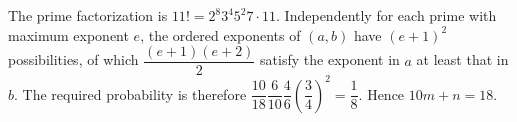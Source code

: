 The prime factorization is $11!=2^8 3^4 5^2 7\cdot11$. Independently for each prime with maximum exponent $e$, the ordered exponents of $(a,b)$ have $(e+1)^2$ possibilities, of which $\dfrac{(e+1)(e+2)}{2}$ satisfy the exponent in $a$ at least that in $b$. The required probability is therefore $\dfrac{10}{18}\dfrac{6}{10}\dfrac{4}{6}\left(\dfrac{3}{4}\right)^2=\dfrac{1}{8}$. Hence $\boxed{10m+n=18}$.

